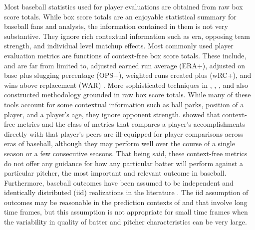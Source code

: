 \documentclass[12pt]{article}
\begin{document}
Most baseball statistics used for player evaluations are obtained from raw box score totals. While box score totals are an enjoyable statistical summary for baseball fans and analysts, the information contained in them is not very substantive. They ignore rich contextual information such as era, opposing team strength, and individual level matchup effects. Most commonly used player evaluation metrics are functions of context-free box score totals. These include, and are far from limited to, adjusted earned run average (ERA+), adjusted on base plus slugging percentage (OPS+), weighted runs created plus (wRC+), and wins above replacement (WAR) \citep{bref, fangraphs}. More sophisticated techniques in \citet{berry1999bridging}, \citet{brown2008season}, \cite{jensen2009hierarchical}, and \cite{baumer2015openwar} also constructed methodology grounded in raw box score totals. While many of these tools account for some contextual information such as ball parks, position of a player, and a player's age, they ignore opponent strength. %
\cite{eck2020challenging} showed that context-free metrics and the class of metrics that compares a player's accomplishments directly with that player's peers are ill-equipped for player comparisons across eras of baseball, although they may perform well over the course of a single season or a few consecutive seasons. That being said, these context-free metrics do not offer any guidance for how any particular batter will perform against a particular pitcher, the most important and relevant outcome in baseball. Furthermore, baseball outcomes have been assumed to be independent and identically distributed (iid) realizations in the literature \citep{brown2008season, jensen2009hierarchical}. The iid assumption of outcomes may be reasonable in the prediction contexts of \cite{brown2008season} and \cite{jensen2009hierarchical} that involve long time frames, but this assumption is not appropriate for small time frames when the variability in quality of batter and pitcher characteristics can be very large.




%
\end{document}
